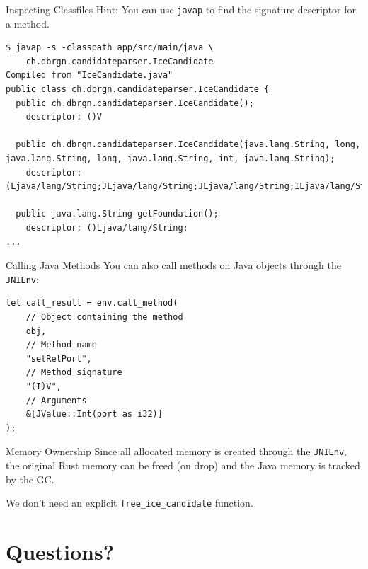 \documentclass[aspectratio=1610,14pt,t]{beamer}
\begin{document}
\begin{frame}[c,fragile]{Inspecting Classfiles}
  Hint: You can use \texttt{javap} to find the signature descriptor for a
  method.

  \begin{verbatim}
$ javap -s -classpath app/src/main/java \
    ch.dbrgn.candidateparser.IceCandidate
Compiled from "IceCandidate.java"
public class ch.dbrgn.candidateparser.IceCandidate {
  public ch.dbrgn.candidateparser.IceCandidate();
    descriptor: ()V

  public ch.dbrgn.candidateparser.IceCandidate(java.lang.String, long, java.lang.String, long, java.lang.String, int, java.lang.String);
    descriptor: (Ljava/lang/String;JLjava/lang/String;JLjava/lang/String;ILjava/lang/String;)V

  public java.lang.String getFoundation();
    descriptor: ()Ljava/lang/String;
...
  \end{verbatim}

\end{frame}

\begin{frame}[c,fragile]{Calling Java Methods}
  You can also call methods on Java objects through the \texttt{JNIEnv}:

  \begin{verbatim}
let call_result = env.call_method(
    // Object containing the method
    obj,
    // Method name
    "setRelPort",
    // Method signature
    "(I)V",
    // Arguments
    &[JValue::Int(port as i32)]
);
  \end{verbatim}
\end{frame}

\begin{frame}[c]{Memory Ownership}
  Since all allocated memory is created through the \texttt{JNIEnv}, the
  original Rust memory can be freed (on drop) and the Java memory is tracked by
  the GC.

  We don't need an explicit \texttt{free\_ice\_candidate} function.
\end{frame}


\section{Questions?}

\end{document}
